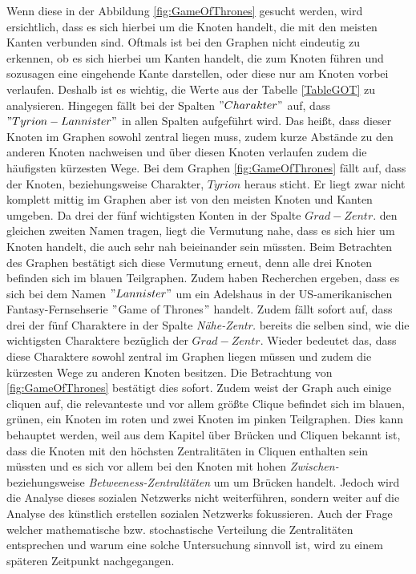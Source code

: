Wenn diese in der Abbildung \ref{fig:GameOfThrones} gesucht werden, wird ersichtlich, dass es sich hierbei um die Knoten handelt, die mit den meisten Kanten verbunden sind. Oftmals ist bei den Graphen nicht eindeutig zu erkennen, ob es sich hierbei um Kanten handelt, die zum Knoten führen und sozusagen eine eingehende Kante darstellen, oder diese nur am Knoten vorbei verlaufen. Deshalb ist es wichtig, die Werte aus der Tabelle \ref{TableGOT} zu analysieren. Hingegen fällt bei der Spalten $"Charakter"$ auf, dass $"Tyrion -Lannister"$ in allen  Spalten aufgeführt wird. Das heißt, dass dieser Knoten im Graphen sowohl zentral liegen muss, zudem kurze Abstände zu den anderen Knoten nachweisen und über diesen Knoten verlaufen zudem die häufigsten kürzesten Wege. Bei dem Graphen \ref{fig:GameOfThrones} fällt auf, dass der Knoten, beziehungsweise Charakter, $Tyrion$  heraus sticht. Er liegt zwar nicht komplett mittig im Graphen aber ist von den meisten Knoten und Kanten umgeben. Da drei der fünf wichtigsten Konten  in der Spalte $Grad-Zentr.$ den gleichen zweiten Namen tragen, liegt die Vermutung nahe, dass es sich hier um Knoten handelt, die auch sehr nah beieinander sein müssten. Beim Betrachten des Graphen bestätigt sich diese Vermutung erneut, denn alle drei Knoten befinden sich im blauen Teilgraphen. Zudem haben Recherchen ergeben, dass es sich bei dem Namen $"Lannister"$ um ein Adelshaus in der US-amerikanischen Fantasy-Fernsehserie $"$Game of Thrones$"$ handelt. Zudem fällt sofort auf, dass drei der fünf Charaktere in der Spalte \textit{Nähe-Zentr.} bereits die selben sind, wie die wichtigsten Charaktere bezüglich der $Grad-Zentr.$ Wieder bedeutet das, dass diese Charaktere sowohl zentral im Graphen liegen müssen und zudem die kürzesten Wege zu anderen Knoten besitzen. Die Betrachtung von \ref{fig:GameOfThrones} bestätigt dies sofort. Zudem weist der Graph auch einige cliquen auf, die relevanteste und vor allem größte Clique befindet sich im blauen, grünen, ein Knoten im roten und zwei Knoten im pinken Teilgraphen. Dies kann behauptet werden, weil aus dem Kapitel über Brücken und Cliquen bekannt ist, dass die Knoten mit den höchsten Zentralitäten in Cliquen enthalten sein müssten und es sich vor allem bei den Knoten mit hohen \textit{Zwischen-} beziehungsweise \textit{Betweeness-Zentralitäten} um um Brücken handelt. Jedoch wird die Analyse dieses sozialen Netzwerks nicht weiterführen, sondern weiter auf die Analyse des künstlich erstellen sozialen Netzwerks fokussieren. Auch der Frage welcher mathematische bzw. stochastische Verteilung die Zentralitäten entsprechen und warum eine solche Untersuchung sinnvoll ist, wird zu einem späteren Zeitpunkt nachgegangen.


